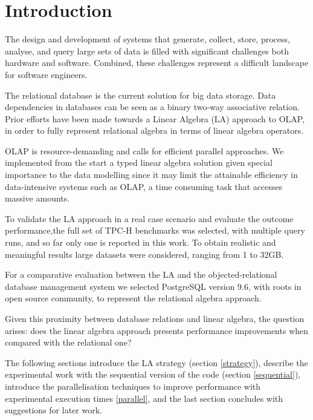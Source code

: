 
\section{Introduction}
\indent

The design and development of systems that generate, collect, store, process, analyse, and query large sets of data is filled with significant challenges both hardware and software. Combined, these challenges represent a difficult landscape for software engineers.\par 
The relational database is the current solution for big data storage.
Data dependencies in databases can be seen as a binary two-way associative relation. 
Prior efforts have been made \cite{macedo2015linear} \cite{da2015benchmarking} towards a Linear Algebra (LA) approach to OLAP, in order to fully represent relational algebra in terms of linear algebra operators.
\par 

OLAP is resource-demanding and calls for efficient 	parallel approaches. 
We implemented from the start a typed linear algebra solution given special importance to the data modelling since it may limit the attainable efficiency in data-intensive systems such as OLAP, a time consuming task that accesses massive amounts. \par 
To validate the LA approach in a real case scenario and evaluate the outcome performance,the full set of TPC-H benchmarks was selected, with multiple query runs, and so far only one is reported in this work. To obtain realistic and meaningful results large datasets were considered, ranging from 1 to 32GB.\par 
For a comparative evaluation between the LA and the objected-relational database management system we selected PostgreSQL version 9.6, with roots in open source community,  to represent the relational algebra approach. \par 
Given this proximity between database relations and linear algebra, the question arises: does the linear algebra approach presents performance improvements when compared with the relational one?\par 

The following sections introduce the LA strategy (section \ref{strategy}), describe the experimental work with the sequential version of the code (section \ref{sequential}), introduce the parallelisation techniques to improve performance 	with experimental execution times \ref{parallel}, and the last section concludes with suggestions for later work.